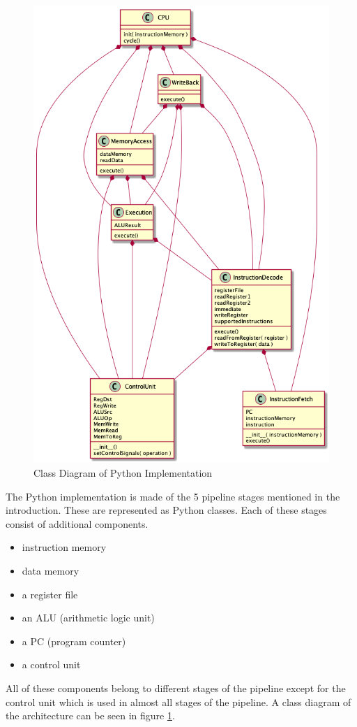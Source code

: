 \documentclass[conference]{IEEEtran}
\begin{document}
\begin{figure}
    \centering
    \includegraphics[scale=.4]{architecture.png}
    \caption{Class Diagram of Python Implementation}
    \label{fig:class_diagram}
\end{figure}

The Python implementation is made of the 5 pipeline stages mentioned in the introduction.  These are represented as Python classes.  Each of these stages consist of additional components.
\begin{itemize}
    \item instruction memory
    \item data memory
    \item a register file
    \item an ALU (arithmetic logic unit)
    \item a PC (program counter)
    \item a control unit
\end{itemize}
All of these components belong to different stages of the pipeline except for the control unit which is used in almost all stages of the pipeline.  A class diagram of the architecture can be seen in figure \ref{fig:class_diagram}.
\end{document}
